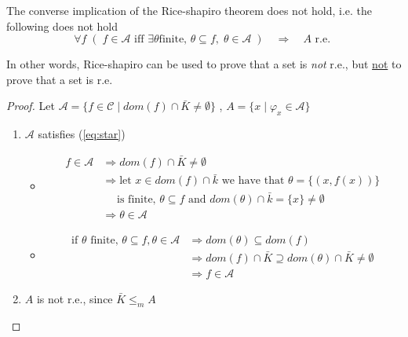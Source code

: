 \begin{observation}
  The converse implication of the Rice-shapiro theorem does not hold, i.e. the following does not hold
  \begin{equation}\label{eq:star}
    \forall f \; (\; f \in \mathcal{A} \mbox{ iff } \exists \theta \mbox{
      finite, } \theta \subseteq f, \; \theta \in \mathcal{A} \; ) \quad
    \Rightarrow \quad A \mbox{ r.e. }
  \end{equation}

  In other words, Rice-shapiro can be used to prove that a set is
  \emph{not} r.e., but \underline{not} to prove that a set is r.e.
  \begin{proof}
    Let
    $\mathcal{A} = \{ f \in \mathcal{C} \mid dom(f) \cap \bar{K} \neq
    \emptyset\}$ , $A = \{x \mid \varphi_x \in \mathcal{A}\}$
  
    \begin{enumerate}
    \item $\mathcal{A}$ satisfies (\ref{eq:star})
      \begin{itemize}
      \item[] 
          \begin{align*}
            f \in \mathcal{A} & \Rightarrow dom(f) \cap \bar{K} \neq \emptyset \\
                                         & \Rightarrow \mbox{let } x \in dom(f) \cap \bar{k} \mbox{ we have that } \theta = \{(x, f(x))\} \\
                                         & \quad \mbox{ is finite, } \theta \subseteq f \mbox{ and } dom(\theta)\cap \bar{k} = \{x\} \neq \emptyset \\
                                         & \Rightarrow \theta \in \mathcal{A}
          \end{align*}
        
  
      \item[]
      \[
          \begin{aligned}
            \mbox{if $\theta$ finite, } \theta \subseteq f, \theta \in \mathcal{A} & \Rightarrow dom(\theta) \subseteq dom(f) \\
            & \Rightarrow dom(f) \cap \bar{K} \supseteq dom(\theta) \cap \bar{K} \neq \emptyset \\
            & \Rightarrow f \in \mathcal{A}
          \end{aligned}
        \]
      \end{itemize}
  
    \item $A$ is not r.e., since $\bar{K} \leq_m A$
  

\end{enumerate}
\end{proof}
\end{observation}

